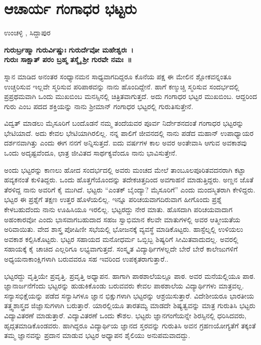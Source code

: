 {\fontsize{14}{16}\selectfont
\chapter{ಆಚಾರ್ಯ ಗಂಗಾಧರ ಭಟ್ಟರು}

\begin{center}
\smallskip
ಉಂಚಳ್ಳಿ , ಸಿದ್ದಾಪುರ
\addrule
\end{center}
\begin{center}
\textbf{ಗುರುರ್ಬ್ರಹ್ಮಾ ಗುರುರ್ವಿಷ್ಣುಃ ಗುರುರ್ದೆವೋ ಮಹೇಶ್ವರಃ~।\\
ಗುರುಃ ಸಾಕ್ಷಾತ್ ಪರಂ ಬ್ರಹ್ಮ ತಸ್ಮೈ  ಶ್ರೀ ಗುರವೇ ನಮಃ~॥}
\end{center}
ಸ್ನಾನ ಮಾಡಿದ ಅನಂತರ ಸಂಧ್ಯಾನಮನ ಸಾಧ್ಯವಾಗದಿದ್ದರೂ ಕೊನೆಯ ಪಕ್ಷ ಈ ಮೇಲಿನ ಶ್ಲೋಕವನ್ನಂತೂ ಉಚ್ಚರಿಸುವ ಇಲ್ಲವೇ ಸ್ಮರಿಸುವ ಪರಿಪಾಠವನ್ನು ನಾನು ಹೊಂದಿದ್ದೇನೆ. ಹಾಗೆ ಕಣ್ಮುಚ್ಚಿ ಸ್ಮರಿಸುವ ಸಂದರ್ಭದಲ್ಲಿ ಪ್ರಪ್ರಥಮವಾಗಿ ಒಂದು ಮುಖಬಿಂಬ ಮನಸ್ಸಿ\-ನಲ್ಲಿ ಚಿತ್ರಿತವಾಗುತ್ತದೆ. ಅದು ಗಂಗಾಧರ ಭಟ್ಟರ ಮುಖಬಿಂಬ. ಆದ್ದರಿಂದ ಗುರು ಎಂಬ ಪದದ ಶಕ್ತಿಯನ್ನು ನಾನು ಶ್ರೀಮಾನ್ ಗಂಗಾಧರ ಭಟ್ಟರಲ್ಲಿ ಗುರುತಿಸುತ್ತೇನೆ.

ವಿದ್ವತ್ ಮಾಡಲು ಮೈಸೂರಿಗೆ ಬಂದೊಡನೆ ನಮ್ಮ ತಂದೆಯವರ ಪೂರ್ವ ನಿರ್ದೇಶನ\-ದಂತೆ ಗಂಗಾಧರ ಭಟ್ಟರನ್ನು ಭೇಟಿಯಾದೆ. ಅದು ಕೇವಲ ಭೇಟಿಯಾಗಿರಲಿಲ್ಲ. ನನ್ನ ಪಾಲಿಗೆ ಜೀವನದಲ್ಲಿ ನಾನು ಪಡೆದ ಮಹಾನ್ ಉಪಾಧ್ಯಾಯರ ದರ್ಶನವಾಗಿತ್ತು ಎಂದು ಈಗ ನನಗೆ ಅನ್ನಿಸುತ್ತದೆ. ಐದು ವರ್ಷಗಳ ಕಾಲ ಅವರ \hbox{ಅಂತೇವಾಸಿ} ಆಗುವ ಅವಕಾಶವು ಒಂದು ಅದೃಷ್ಟವೆಂದೂ, ಛಾತ್ರ ಜೀವಿತದ ಸಾರ್ಥಕ್ಯವೆಂದೂ ನಾನು ಭಾವಿಸುತ್ತೇನೆ.

ಅಂದು ಭಟ್ಟರನ್ನು ಕಾಣಲು ಹೋದ ಸಂದರ್ಭದಲ್ಲಿ ಅವರು ಮಂಚದ ಮೇಲೆ ತಾಂಬೂಲಪೂರಿತವದನರಾಗಿ ಕಟ್ಟಾ ಹವ್ಯಕನಂತೆ ಕುಳಿತಿದ್ದರು. ಒಂದು ಹೊತ್ತಗೆ\-ಯೊಂದನ್ನು ತದೇಕಚಿತ್ತದಿಂದ ಅವಗಾಹನೆ ಮಾಡುತ್ತಿದ್ದರು. ಅಣ್ಣನ ಜೊತೆ ತೆರಳಿದ್ದ ನಾನು ಅವರಿಗೆ ಕೈ ಮುಗಿದೆ. ಭಟ್ಟರು “ಎಂತಕ್ ಬೈಂದ್ಯಾ? ಮೈಸೂರಿಗೆ” ಎಂದು ಮಂದಸ್ಮಿತರಾಗಿ ಕೇಳಿದ್ದರು. ಭಟ್ಟರ ಈ ಪ್ರಶ್ನೆಗೆ ತಕ್ಷಣ ಉತ್ತರ ಹೊಳೆಯಲಿಲ್ಲ. ಇನ್ನೂ ಪರಿಚಯ\-ವಾಗದಿರುವಾಗ ಹೀಗೊಂದು ಪ್ರಶ್ನೆ ಕೇಳಬಹುದೆಂದು ನಾನು ಊಹಿಸಿಯೂ ಇರಲಿಲ್ಲ. ಭಟ್ಟರದ್ದು ನೇರ ಮಾತು. ಹೊಸದಾಗಿ ಪರಿಚಯವಾದಾಗ \hbox{ಅಹಂಕಾರವೋ} ಎಂದು ಭಾಸವಾಗಬಹುದಾದ ಸಹಜ ಸ್ವಾಭಿಮಾನ ಕೆಲವೇ ಮಾತುಗಳಲ್ಲಿ ಅವರ ಆತ್ಮೀಯತೆಯ ಅರಿವಾಯಿತು. ವೇದ ಶಾಸ್ತ್ರ ಪೋಷಿಣೀ ಸಭೆಯಲ್ಲಿ ಭೋಜನಕ್ಕೆ ವ್ಯವಸ್ಥೆ ಮಾಡಿ\-ಕೊಟ್ಟರು. ಹಾಸ್ಟೆಲ್ನಲ್ಲಿ ಉಳಿಯಲು ಅವಕಾಶ ಕಲ್ಪಿಸಿಕೊಟ್ಟರು. ಭಟ್ಟರ \hbox{ಸಹಾಯದ} ಮನೋಧರ್ಮ ಒಬ್ಬಿಬ್ಬ ಶಿಷ್ಯರಿಗೆ ಸೀಮಿತವಾದುದಲ್ಲ. ಅವರಲ್ಲಿ ಸಹಾಯಕ್ಕೆ ಕೈ ಚಾಚಿದ ಎಲ್ಲರಿಗೂ ಲಭ್ಯವಾಗುತ್ತದೆ. ಸಂಸ್ಕೃತ ವಿದ್ಯಾರ್ಥಿಗಳಲ್ಲದೇ ಬೇರೆ ಬೇರೆ ಕಾಲೇಜುಗಳಿಗೆ ಅಧ್ಯಯನಾಕಾಂಕ್ಷಿಗಳಾಗಿ ಬರುವವರೂ ಸಹ ಇವರಿಂದ ಉಪಕೃತ\-ರಾಗುತ್ತಾರೆ..

ಭಟ್ಟರದ್ದು ವೃತ್ತಿಯೇ ಪ್ರವೃತ್ತಿ. ಪ್ರವೃತ್ತಿ ಅಧ್ಯಾಪನ. ಹಾಗಾಗಿ ಪಾಠಶಾಲೆಯಲ್ಲೂ ಪಾಠ. ಅವರ ಮನೆಯಲ್ಲಿಯೂ ಪಾಠ. ಜ್ಞಾನಾರ್ಜನೆಗೆಂದು ಭಟ್ಟರನ್ನು ಹುಡುಕಿಕೊಂಡು ಬರುವವರು ಕೇವಲ ಪಾಠಶಾಲೆಯ ವಿದ್ಯಾರ್ಥಿಗಳು ಮಾತ್ರವಲ್ಲ. ಸನ್ಯಾಸಭಿಕ್ಷೆಯನ್ನು ಪಡೆದ ಸನ್ಯಾಸಿಗಳೂ ಜ್ಞಾನ ಭಿಕ್ಷುಗಳಾಗಿ ಭಟ್ಟರನ್ನು ಆಶ್ರಯಿಸುತ್ತಾರೆ. ವಿದೇಶೀಯರೂ ಭಾರತೀಯ ತತ್ತ್ವಶಾಸ್ತ್ರದ ಜಿಜ್ಞಾಸುಗಳಾಗಿ ಬರುತ್ತಾರೆ. ಯಾರಲ್ಲಿಯೂ ತಾರತಮ್ಯ ಮಾಡದೇ ಶಿಷ್ಯತ್ವವನ್ನು ಮಾತ್ರ ಗುರುತಿಸಿ ಭಟ್ಟರು ವಿದ್ಯಾವಿತರಣೆ ಮಾಡುತ್ತಾರೆ. ವಿದ್ಯಾವಿತರಣೆ ಒಂದು ಕೌಶಲ. ಭಟ್ಟರು ಜ್ಞಾನಗಂಗೆಯನ್ನೇ ಶಿರಸ್ಸಿನಲ್ಲಿ ಧರಿಸಿದವರು, ಹೃದ್ಗತಮಾಡಿಕೊಂಡವರು. ಹಾಗಿದ್ದರೂ ವಿದ್ಯಾರ್ಥಿಯ ಜ್ಞಾನದ ಸ್ತರವನ್ನು ಗುರುತಿಸಿ ಅವನ ಗ್ರಹಣಯೋಗ್ಯತೆಗೆ ತಕ್ಕಂತೆ ತಮ್ಮ ಜ್ಞಾನವನ್ನು ಪ್ರದಾನ ಮಾಡುವ ಭಟ್ಟರ ಅಧ್ಯಾಪನ ಶೈಲಿಯು ಅನುಪಮವಾದದ್ದು.

}
